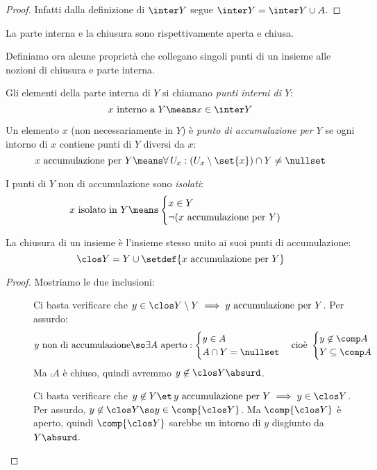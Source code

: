 \begin{proof}
	Infatti dalla definizione di $\inter Y$ segue $\inter Y=\inter Y\cup A$.
\end{proof}

\begin{oss}
	La parte interna e la chiusura sono rispettivamente aperta e chiusa.
\end{oss}

Definiamo ora alcune proprietà che collegano singoli punti di un insieme alle nozioni di chiusura e parte interna.

\begin{defn}
	Gli elementi della parte interna di $Y$ si chiamano \emph{punti interni di $Y$}:
	\[x\text{ interno a }Y\means x\in\inter Y\]
\end{defn}

\begin{defn}
	Un elemento $x$ (non necessariamente in $Y$) è \emph{punto di accumulazione per $Y$} se ogni intorno di $x$ contiene punti di $Y$ diversi da $x$:
	\[x\text{ accumulazione per }Y\means\forall\,U_x:(U_x\setminus\set{x})\cap Y\neq\nullset\]
\end{defn}

\begin{defn}
	I punti di $Y$ non di accumulazione sono \emph{isolati}:
	\[x\text{ isolato in }Y\means
	\begin{cases}
		x\in Y\\
		\neg(x\text{ accumulazione per }Y)
	\end{cases}\]
\end{defn}

\begin{lemma}
	\label{th:chiusuraacc}
	La chiusura di un insieme è l'insieme stesso unito ai suoi punti di accumulazione:
	\[\clos Y=Y\cup\setdef{x\text{ accumulazione per }Y}\]
\end{lemma}

\begin{proof}
	Mostriamo le due inclusioni:
	\begin{description}
		\item[\proofsubseteq]
		Ci basta verificare che $y\in\clos Y\setminus Y\implies y\text{ accumulazione per }Y$.
		Per assurdo:
		\[y\text{ non di accumulazione}\so
		\exists A\text{ aperto}:
		\begin{cases}
			y\in A\\
			A\cap Y=\nullset
		\end{cases}\text{cioè }
		\begin{cases}
			y\not\in\comp A\\
			Y\subseteq\comp A
		\end{cases}\]
		Ma $\comp A$ è chiuso, quindi avremmo $y\not\in\clos Y\absurd$.
		\item[\proofsupseteq]
		Ci basta verificare che $y\not\in Y\et\, y\text{ accumulazione per }Y\implies y\in\clos Y$.
		Per assurdo, $y\not\in\clos Y\so y\in\comp{\clos Y}$. Ma $\comp{\clos Y}$ è aperto, quindi $\comp{\clos Y}$ sarebbe un intorno di $y$ disgiunto da $Y\absurd$. \qedhere
	\end{description}
\end{proof}

